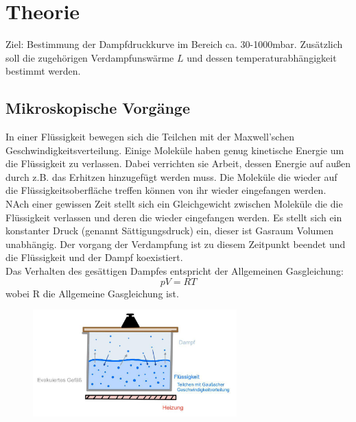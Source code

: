 \newpage
\section{Theorie}
\label{sec:theorie}
Ziel: Bestimmung der Dampfdruckkurve im Bereich ca. 30-1000mbar.
Zusätzlich soll die zugehörigen Verdampfunswärme $L$ und dessen temperaturabhängigkeit bestimmt werden.\\

\subsection{Mikroskopische Vorgänge}
In einer Flüssigkeit bewegen sich die Teilchen mit der Maxwell'schen Geschwindigkeitsverteilung.
Einige Moleküle haben genug kinetische Energie um die Flüssigkeit zu verlassen.
Dabei verrichten sie Arbeit, dessen Energie auf außen durch z.B. das Erhitzen hinzugefügt werden muss.
Die Moleküle die wieder auf die Flüssigkeitsoberfläche treffen können von ihr wieder eingefangen werden.
NAch einer gewissen Zeit stellt sich ein Gleichgewicht zwischen Moleküle die die Flüssigkeit verlassen und deren
die wieder eingefangen werden.
Es stellt sich ein konstanter Druck (genannt Sättigungsdruck) ein, dieser ist Gasraum Volumen unabhängig. Der vorgang der Verdampfung ist zu diesem Zeitpunkt beendet und
die Flüssigkeit und der Dampf koexistiert.\\
Das Verhalten des gesättigen Dampfes entspricht der Allgemeinen Gasgleichung:
\begin{equation}
    pV=RT
    \label{eqn:gasgl}
\end{equation}
wobei R die Allgemeine Gasgleichung ist.

\begin{figure}
    \centering
    \includegraphics[width=0.7\textwidth]{bilder/kessel.jpg}
\end{figure}

